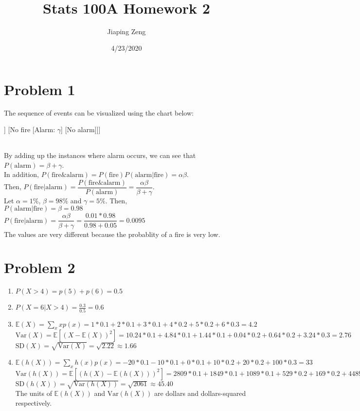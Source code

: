 \documentclass{article}
\title{Stats 100A Homework 2}
\author{Jiaping Zeng}
\date{4/23/2020}
\begin{document}
\maketitle

\section*{Problem 1}
The sequence of events can be visualized using the chart below:\\
	\begin{forest}
		[Any moment [Fire: $\alpha$ [Alarm: $\beta$] [No alarm]] [No fire [Alarm: $\gamma$] [No alarm]]]
	\end{forest}\\
By adding up the instances where alarm occurs, we can see that $P(\text{alarm})=\beta+\gamma$.\\
In addition, $P(\text{fire\&alarm})=P(\text{fire})P(\text{alarm}|\text{fire})=\alpha\beta$.\\
Then, $P(\text{fire}|\text{alarm})=\dfrac{P(\text{fire\&alarm})}{P(\text{alarm})}=\boxed{\dfrac{\alpha\beta}{\beta+\gamma}}$.\\
Let $\alpha=1\%$, $\beta=98\%$ and $\gamma=5\%$. Then,\\
$P(\text{alarm}|\text{fire})=\beta=0.98$\\
$P(\text{fire}|\text{alarm})=\dfrac{\alpha\beta}{\beta+\gamma}=\dfrac{0.01*0.98}{0.98+0.05}=0.0095$\\
The values are very different because the probablity of a fire is very low.

\section*{Problem 2}
\begin{enumerate}
	\item $P(X>4)=p(5)+p(6)=0.5$
	\item $P(X=6|X>4)=\frac{0.3}{0.5}=0.6$
	\item $\mathbb{E}(X)=\sum_x xp(x)=1*0.1+2*0.1+3*0.1+4*0.2+5*0.2+6*0.3=\boxed{4.2}$\\$\text{Var}(X)=\mathbb{E}[(X-\mathbb{E}(X))^2]=10.24*0.1+4.84*0.1+1.44*0.1+0.04*0.2+0.64*0.2+3.24*0.3=\boxed{2.76}$\\$\text{SD}(X)=\sqrt{\text{Var}(X)}=\sqrt{2.22}\approx\boxed{1.66}$
	\item $\mathbb{E}(h(X))=\sum_x h(x)p(x)=-20*0.1-10*0.1+0*0.1+10*0.2+20*0.2+100*0.3=\boxed{33}$\\$\text{Var}(h(X))=\mathbb{E}[(h(X)-\mathbb{E}(h(X)))^2]=2809*0.1+1849*0.1+1089*0.1+529*0.2+169*0.2+4489*0.3=\boxed{2061}$\\$\text{SD}(h(X))=\sqrt{\text{Var}(h(X))}=\sqrt{2061}\approx\boxed{45.40}$\\The units of $\mathbb{E}(h(X))$ and $\text{Var}(h(X))$ are dollars and dollars-squared respectively.
\end{enumerate}
\end{document}

